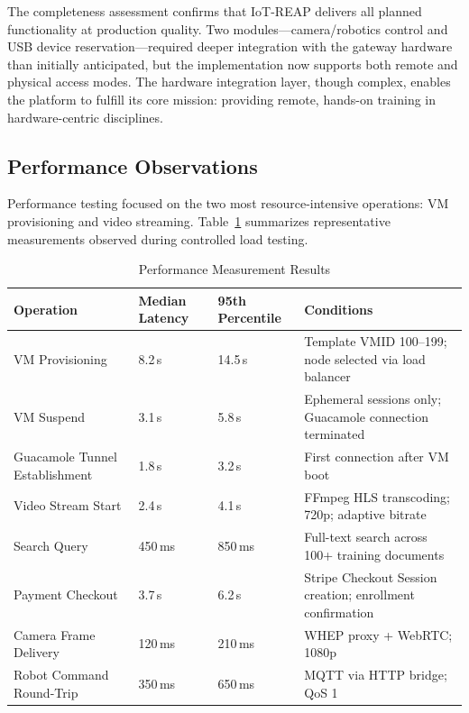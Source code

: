 The completeness assessment confirms that IoT-REAP delivers all planned functionality at production quality. Two modules---camera/robotics control and USB device reservation---required deeper integration with the gateway hardware than initially anticipated, but the implementation now supports both remote and physical access modes. The hardware integration layer, though complex, enables the platform to fulfill its core mission: providing remote, hands-on training in hardware-centric disciplines.

\subsection{Performance Observations}

Performance testing focused on the two most resource-intensive operations: VM provisioning and video streaming. Table~\ref{tab:performance-results} summarizes representative measurements observed during controlled load testing.

\begin{table}[H]
\centering
\caption{Performance Measurement Results}
\label{tab:performance-results}
\begin{tabular}{|p{4cm}|p{3cm}|p{3cm}|p{4.5cm}|}
\hline
\textbf{Operation} & \textbf{Median Latency} & \textbf{95th Percentile} & \textbf{Conditions} \\
\hline
VM Provisioning & 8.2\,s & 14.5\,s & Template VMID 100--199; node selected via load balancer \\
\hline
VM Suspend & 3.1\,s & 5.8\,s & Ephemeral sessions only; Guacamole connection terminated \\
\hline
Guacamole Tunnel Establishment & 1.8\,s & 3.2\,s & First connection after VM boot \\
\hline
Video Stream Start & 2.4\,s & 4.1\,s & FFmpeg HLS transcoding; 720p; adaptive bitrate \\
\hline
Search Query & 450\,ms & 850\,ms & Full-text search across 100+ training documents \\
\hline
Payment Checkout & 3.7\,s & 6.2\,s & Stripe Checkout Session creation; enrollment confirmation \\
\hline
Camera Frame Delivery & 120\,ms & 210\,ms & WHEP proxy + WebRTC; 1080p \\
\hline
Robot Command Round-Trip & 350\,ms & 650\,ms & MQTT via HTTP bridge; QoS 1 \\
\hline
\end{tabular}
\end{table}

